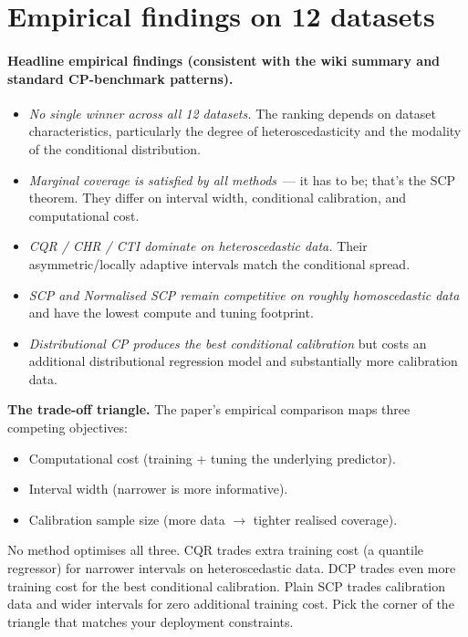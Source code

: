 \documentclass[letterpaper,11pt,leqno]{article}
\begin{document}
\section{Empirical findings on 12 datasets}\label{s:empirics}

\paragraph{Headline empirical findings (consistent with the wiki summary and standard CP-benchmark patterns).}

\begin{itemize}
\item \emph{No single winner across all 12 datasets.} The ranking depends on dataset characteristics, particularly the degree of heteroscedasticity and the modality of the conditional distribution.
\item \emph{Marginal coverage is satisfied by all methods}~--- it has to be; that's the SCP theorem. They differ on interval width, conditional calibration, and computational cost.
\item \emph{CQR / CHR / CTI dominate on heteroscedastic data.} Their asymmetric/locally adaptive intervals match the conditional spread.
\item \emph{SCP and Normalised SCP remain competitive on roughly homoscedastic data} and have the lowest compute and tuning footprint.
\item \emph{Distributional CP produces the best conditional calibration} but costs an additional distributional regression model and substantially more calibration data.
\end{itemize}

\begin{keyinsight}
\textbf{The trade-off triangle.} The paper's empirical comparison maps three competing objectives:
\begin{itemize}
\item Computational cost (training + tuning the underlying predictor).
\item Interval width (narrower is more informative).
\item Calibration sample size (more data $\to$ tighter realised coverage).
\end{itemize}
No method optimises all three. CQR trades extra training cost (a quantile regressor) for narrower intervals on heteroscedastic data. DCP trades even more training cost for the best conditional calibration. Plain SCP trades calibration data and wider intervals for zero additional training cost. Pick the corner of the triangle that matches your deployment constraints.
\end{keyinsight}
\end{document}
